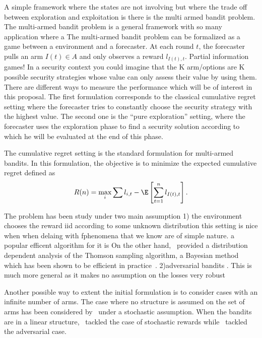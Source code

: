 A simple framework where the states are not involving but where the trade off between exploration and exploitation is there is the multi armed bandit problem.
The multi-armed bandit problem is a general framework with so many application where a 
The multi-armed bandit problem can be formalized as a game between a environment and a forecaster. At each round $t$, the forecaster pulls an arm $I(t)\in A$ and only observes a reward $l_{I(t),t}$.  Partial information games! In a security context you could imagine that the K arm/options are K possible security strategies whose value can  only assess their value by using them. There are different ways to measure the performance which will be of interest in this proposal.  The first formulation corresponds to the classical cumulative regret setting where the forecaster tries to constantly choose the security strategy with the highest value.  The second one is the ``pure exploration'' setting, where the forecaster uses the exploration phase to find a security solution according to which he will be evaluated at the end of this phase.

The cumulative regret setting is the standard formulation for multi-armed bandits. In this formulation, the objective is to minimize the expected cumulative regret defined as
%
\begin{equation*}
R(n)=\max_i\sum l_{i,t}-\E\left[\sum_{t=1}^n l_{I(t),t}\right].
\end{equation*}
%

The problem has been study under two main assumption 1) the environment chooses the reward iid according to some unknown distribution this setting is nice when when delaing with fphenomena that we know are of simple nature. a popular efficent  algorithm for it is On the other hand,~\mbox{\cite{Kaufmann12TS}} provided a distribution dependent analysis of the Thomson sampling algorithm, a Bayesian method which has been shown to be efficient in practice~\cite{Chapelle11EE}. 2)adversarial bandits 
\cite{Auer03NS}. This is much more general as it makes no assumption on the losses very robust

Another possible way to extent the initial formulation is to consider cases with an infinite number of arms.
The case where no structure is assumed on the set of arms has been considered by~\cite{Wang08AI} under a stochastic assumption. When the bandits are in a linear structure,~\cite{Abbasi-Yadkori11IA} tackled the case of stochastic rewards while~\cite{Dani07TP} tackled the adversarial case. 

